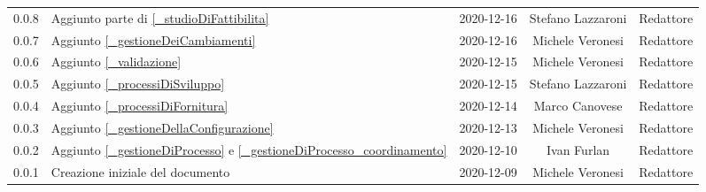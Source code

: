 \begin{center}
\begin{longtable}{|c|p{5cm}|c|c|c|}
		0.0.8 & Aggiunto parte di \ref{_studioDiFattibilita} & 2020-12-16 & Stefano Lazzaroni & Redattore \\
		0.0.7 & Aggiunto \ref{_gestioneDeiCambiamenti} & 2020-12-16 & Michele Veronesi & Redattore \\
		0.0.6 & Aggiunto \ref{_validazione} & 2020-12-15 & Michele Veronesi & Redattore \\
		0.0.5 & Aggiunto \ref{_processiDiSviluppo} & 2020-12-15 & Stefano Lazzaroni & Redattore \\
		0.0.4 & Aggiunto \ref{_processiDiFornitura} & 2020-12-14 & Marco Canovese & Redattore \\
		0.0.3 & Aggiunto \ref{_gestioneDellaConfigurazione} & 2020-12-13 & Michele Veronesi & Redattore \\
		0.0.2 & Aggiunto \ref{_gestioneDiProcesso} e \ref{_gestioneDiProcesso_coordinamento} & 2020-12-10 & Ivan Furlan & Redattore \\
		0.0.1 & Creazione iniziale del documento & 2020-12-09 & Michele Veronesi & Redattore \\
		
		\hline
	\end{longtable}
\end{center}
